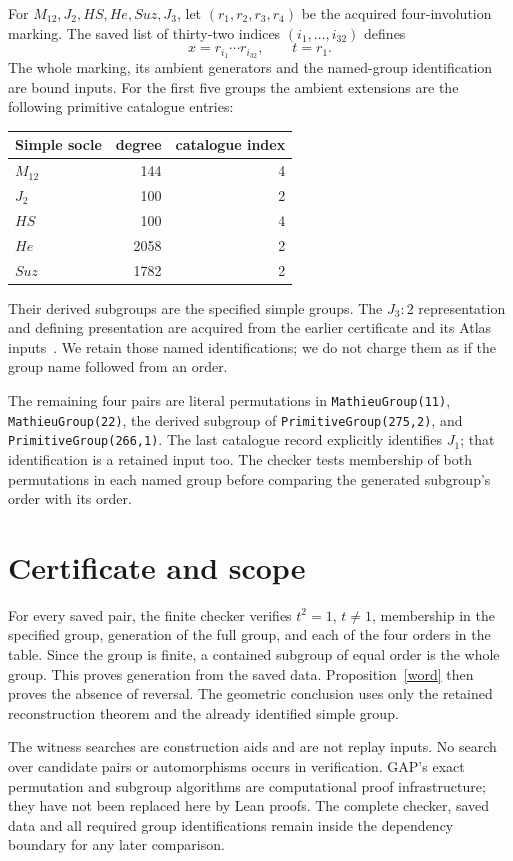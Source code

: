 \documentclass[11pt,a4paper]{article}
\begin{document}
For $M_{12},J_2,HS,He,Suz,J_3$, let $(r_1,r_2,r_3,r_4)$ be the acquired
four-involution marking. The saved list of thirty-two indices
$(i_1,\ldots,i_{32})$ defines
\[
          x=r_{i_1}\cdots r_{i_{32}},\qquad t=r_1.
\]
The whole marking, its ambient generators and the named-group
identification are bound inputs. For the first five groups the
ambient extensions are the following primitive catalogue entries:
\begin{center}
\begin{tabular}{lrr}\toprule
Simple socle&degree&catalogue index\\\midrule
$M_{12}$&144&4\\
$J_2$&100&2\\
$HS$&100&4\\
$He$&2058&2\\
$Suz$&1782&2\\\bottomrule
\end{tabular}
\end{center}
Their derived subgroups are the specified simple groups. The $J_3:2$ representation and defining
presentation are acquired from the earlier certificate and its
Atlas inputs~\cite{Atlas}. We retain those named identifications;
we do not charge them as if the group name followed from an order.

The remaining four pairs are literal permutations in
\texttt{MathieuGroup(11)}, \texttt{MathieuGroup(22)},
the derived subgroup of \texttt{PrimitiveGroup(275,2)}, and
\texttt{PrimitiveGroup(266,1)}. The last catalogue record explicitly
identifies $J_1$; that identification is a retained input too.
The checker tests membership of both permutations in each named
group before comparing the generated subgroup's order with its order.

\section{Certificate and scope}
For every saved pair, the finite checker verifies $t^2=1$, $t\ne1$,
membership in the specified group, generation of the full group,
and each of the four orders in the table. Since the group is finite,
a contained subgroup of equal order is the whole group. This proves
generation from the saved data. Proposition~\ref{word} then proves
the absence of reversal. The geometric conclusion uses only the
retained reconstruction theorem and the already identified simple
group.

The witness searches are construction aids and are not replay inputs.
No search over candidate pairs or automorphisms occurs in verification.
GAP's exact permutation and subgroup algorithms are computational proof
infrastructure; they have not been replaced here by Lean proofs.
The complete checker, saved data and all required group identifications
remain inside the dependency boundary for any later comparison.
\end{document}
